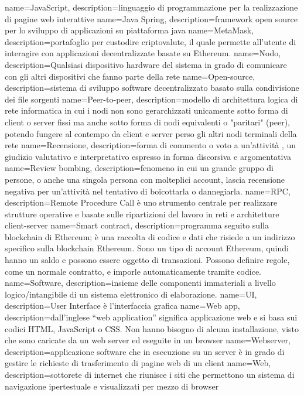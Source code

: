  { name={JavaScript}, description={linguaggio di programmazione per la realizzazione di pagine web interattive} }
 { name={Java Spring}, description={framework open source per lo sviluppo di applicazioni su piattaforma java} }
 { name={MetaMask}, description={portafoglio per custodire criptovalute, il quale permette all'utente di interagire con applicazioni decentralizzate basate su Ethereum.} }
 { name={Nodo}, description={Qualsiasi dispositivo hardware del sistema in grado di comunicare con gli altri dispositivi che fanno parte della rete} }
 { name={Open-source}, description={sistema di sviluppo software decentralizzato basato sulla condivisione dei file sorgenti} }
 { name={Peer-to-peer}, description={modello di architettura logica di rete informatica in cui i nodi non sono gerarchizzati unicamente sotto forma di client o server fissi ma anche sotto forma di nodi equivalenti o "paritari" (peer), potendo fungere al contempo da client e server perso gli altri nodi terminali della rete} }
 { name={Recensione}, description={forma di commento o voto a un'attività , un giudizio valutativo e interpretativo espresso in forma discorsiva e argomentativa} }
 { name={Review bombing}, description={fenomeno in cui un grande gruppo di persone, o anche una singola persona con molteplici account, lascia recensione negativa per un'attività nel tentativo di boicottarla o dannegiarla.} }
 { name={RPC}, description={Remote Procedure Call è uno strumento centrale per realizzare strutture operative e basate sulle ripartizioni del lavoro in reti e architetture client-server} }
 { name={Smart contract}, description={programma seguito sulla blockchain di Ethereum; è una raccolta di codice e dati che risiede a un indirizzo specifico sulla blockchain Ethereum. Sono un tipo di account Ethereum, quindi hanno un saldo e possono essere oggetto di transazioni. Possono definire regole, come un normale contratto, e imporle automaticamente tramite codice.} }
 { name={Software}, description={insieme delle componenti immateriali a livello logico/intangibile di un sistema elettronico di elaborazione.} }
 { name={UI}, description={User Interface è l'interfaccia grafica} }
 { name={Web app}, description={dall'inglese “web application” significa applicazione web e si basa sui codici HTML, JavaScript o CSS. Non hanno bisogno di alcuna installazione, visto che sono caricate da un web server ed eseguite in un browser} }
 { name={Webserver}, description={applicazione software che in esecuzione su un server è in grado di gestire le richieste di trasferimento di pagine web di un client} }
 { name={Web}, description={sottorete di internet che riunisce i siti che permettono un sistema di navigazione ipertestuale e visualizzati per mezzo di browser} }
